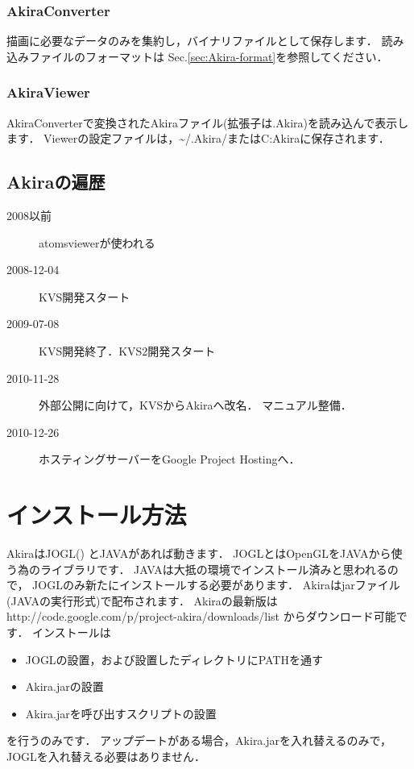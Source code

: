 \documentclass[a4j,openany]{jbook}
\begin{document}
  \subsection*{AkiraConverter}
 描画に必要なデータのみを集約し，バイナリファイルとして保存します．
 読み込みファイルのフォーマットは Sec.\ref{sec:Akira-format}を参照してください．

  \subsection*{AkiraViewer}
 AkiraConverterで変換されたAkiraファイル(拡張子は.Akira)を読み込んで表示します．
 Viewerの設定ファイルは，\~{}/.Akira/またはC:Akiraに保存されます．

 \section{Akiraの遍歴}
\begin{description}
 \item[2008以前]
            atomsviewerが使われる
 \item[2008-12-04]
            KVS開発スタート
 \item[2009-07-08]
            KVS開発終了．KVS2開発スタート
 \item[2010-11-28]
            外部公開に向けて，KVSからAkiraへ改名．
            マニュアル整備．
 \item[2010-12-26]
            ホスティングサーバーをGoogle Project Hostingへ．
\end{description}
\chapter{インストール方法}
AkiraはJOGL()
とJAVAがあれば動きます．
JOGLとはOpenGLをJAVAから使う為のライブラリです．
JAVAは大抵の環境でインストール済みと思われるので，
JOGLのみ新たにインストールする必要があります．
Akiraはjarファイル(JAVAの実行形式)で配布されます．
Akiraの最新版は
{http://code.google.com/p/project-akira/downloads/list}
からダウンロード可能です．
インストールは
\begin{itemize}
 \item JOGLの設置，および設置したディレクトリにPATHを通す
 \item Akira.jarの設置
 \item Akira.jarを呼び出すスクリプトの設置
\end{itemize}
を行うのみです．
アップデートがある場合，Akira.jarを入れ替えるのみで，JOGLを入れ替える必要はありません．
\end{document}
